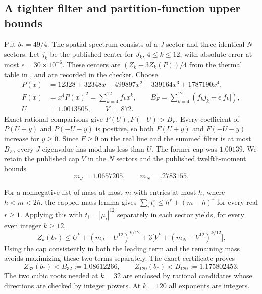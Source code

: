 \documentclass[11pt,a4paper]{article}
\begin{document}
\subsection{A tighter filter and partition-function upper bounds}
Put $b_*=49/4$. The spatial spectrum consists of a $J$ sector and three
identical $N$ sectors. Let $j_k$ be the published center for $J_k$,
$4\le k\le12$, with absolute error at most
$\epsilon=30\times10^{-6}$. These centers are
$(Z_k+3Z_k(P))/4$ from the thermal table in
\cite[Lemma 5.1]{upstream}, and are recorded in the checker.
Choose
\begin{align*}
 P(x)&=12328+32348x-499897x^2-339164x^3+1787190x^4,\\
 F(x)&=x^4P(x)^2=\sum_{k=4}^{12}f_kx^k,\qquad
 B_F=\sum_{k=4}^{12}(f_kj_k+\epsilon|f_k|),\\
 U&=1.0013505,\qquad V=.872.
\end{align*}
Exact rational comparisons give $F(U),F(-U)>B_F$.
Every coefficient of $P(U+y)$ and $P(-U-y)$ is positive, so both
$F(U+y)$ and $F(-U-y)$ increase for $y\ge0$.
Since $F\ge0$ on the real line and the summed filter is at most $B_F$,
every $J$ eigenvalue has modulus less than $U$. The former cap was
$1.00139$. We retain the published cap $V$ in the $N$ sectors and the
published twelfth-moment bounds
\[
 m_J=1.0657205,\qquad m_N=.2783155.
\]

For a nonnegative list of mass at most $m$ with entries at most $h$,
where $h<m<2h$, the capped-mass lemma gives
$\sum_i t_i^r\le h^r+(m-h)^r$ for every real $r\ge1$.
Applying this with $t_i=|\mu_i|^{12}$ separately in each sector yields,
for every even integer $k\ge12$,
\begin{equation}\label{eq:spectral-Z}
 Z_k(b_*)\le U^k+(m_J-U^{12})^{k/12}
       +3\bigl[V^k+(m_N-V^{12})^{k/12}\bigr].
\end{equation}
Using the cap consistently in both the leading term and the remaining
mass avoids maximizing these two terms separately.
The exact certificate proves
\begin{equation}\label{eq:spectral-Zvalues}
 Z_{32}(b_*)<B_{32}:=1.08612266,\qquad
 Z_{120}(b_*)<B_{120}:=1.175802453.
\end{equation}
The two cubic roots needed at $k=32$ are enclosed by rational candidates
whose directions are checked by integer powers. At $k=120$ all
exponents are integers.
\end{document}
